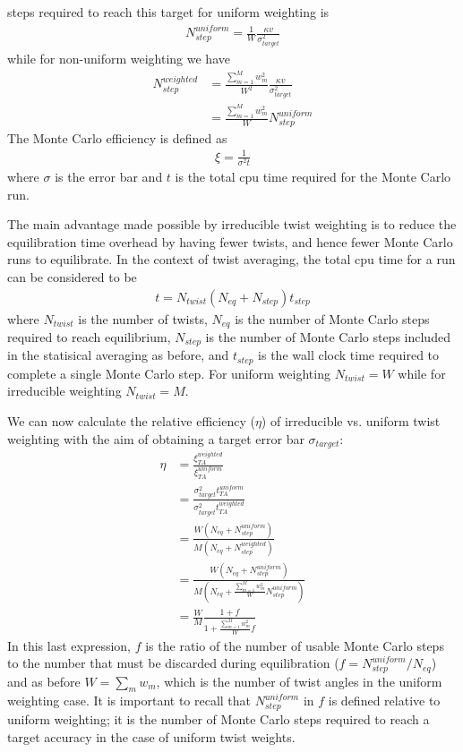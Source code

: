 steps required to reach this target for uniform weighting is
\begin{align}
  N_{step}^{uniform} = \frac{1}{W}\frac{\kappa v}{\sigma_{target}^2}
\end{align}
while for non-uniform weighting we have
\begin{align}\label{eq:weighted_step}
  N_{step}^{weighted} &= \frac{\sum_{m=1}^Mw_m^2}{W^2}\frac{\kappa v}{\sigma_{target}^2} \nonumber\\
                  &=\frac{\sum_{m=1}^Mw_m^2}{W}N_{step}^{uniform}
\end{align}
The Monte Carlo efficiency is defined as 
\begin{align}
  \xi = \frac{1}{\sigma^2t}
\end{align}
where $\sigma$ is the error bar and $t$ is the total cpu time required 
for the Monte Carlo run.  

The main advantage made possible by irreducible twist weighting is to 
reduce the equilibration time overhead by having fewer twists, and 
hence fewer Monte Carlo runs to equilibrate.  In the context of twist 
averaging, the total cpu time for a run can be considered to be
\begin{align}
  t=N_{twist}(N_{eq}+N_{step})t_{step}
\end{align}
where $N_{twist}$ is the number of twists, $N_{eq}$ is the number of Monte 
Carlo steps required to reach equilibrium, $N_{step}$ is the number 
of Monte Carlo steps included in the statisical averaging as before, 
and $t_{step}$ is the wall clock time required to complete a single 
Monte Carlo step. For uniform weighting $N_{twist}=W$ while for irreducible 
weighting $N_{twist}=M$.

We can now calculate the relative efficiency ($\eta$) of irreducible vs. 
uniform twist weighting with the aim of obtaining a target error bar 
$\sigma_{target}$:
\begin{align}
  \eta &= \frac{\xi_{TA}^{weighted}}{\xi_{TA}^{uniform}} \nonumber \\
       &= \frac{\sigma_{target}^2t_{TA}^{uniform}}{\sigma_{target}^2t_{TA}^{weighted}} \nonumber \\
       &= \frac{W(N_{eq}+N_{step}^{uniform})}{M(N_{eq}+N_{step}^{weighted})} \nonumber \\
       &= \frac{W(N_{eq}+N_{step}^{uniform})}{M(N_{eq}+\frac{\sum_{m=1}^Mw_m^2}{W}N_{step}^{uniform})} \nonumber \\
       &= \frac{W}{M}\frac{1+f}{1+\frac{\sum_{m=1}^Mw_m^2}{W}f}
\end{align}
In this last expression, $f$ is the ratio of the number of usable 
Monte Carlo steps to the number that must be discarded during equilibration 
($f=N_{step}^{uniform}/N_{eq}$) and as before $W=\sum_mw_m$, which is the number of 
twist angles in the uniform weighting case.  It is important to recall 
that $N_{step}^{uniform}$ in $f$ is defined relative to uniform weighting; it is 
the number of Monte Carlo steps required to reach a target accuracy in the 
case of uniform twist weights.

